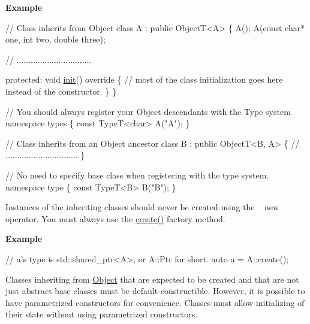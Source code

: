 {\bfseries Example} 
\begin{DoxyCode}
\textcolor{comment}{// Class inherits from Object}
\textcolor{keyword}{class }A : \textcolor{keyword}{public} ObjectT<A>
\{
    A();
    A(\textcolor{keyword}{const} \textcolor{keywordtype}{char}* one, \textcolor{keywordtype}{int} two, \textcolor{keywordtype}{double} three);

    \textcolor{comment}{// ................................}

\textcolor{keyword}{protected}:
    \textcolor{keywordtype}{void} \hyperlink{group___utility_module_gaedfd950d41ec88d7eff2a7a9929e45e8}{init}()\textcolor{keyword}{ override}
\textcolor{keyword}{    }\{
        \textcolor{comment}{// most of the class initialization goes here instead of the constructor.}
    \}
\}

\textcolor{comment}{// You should always register your Object descendants with the Type system}
\textcolor{keyword}{namespace }types \{ \textcolor{keyword}{const} TypeT<char> A(\textcolor{stringliteral}{"A"}); \}

\textcolor{comment}{// Class inherits from an Object ancestor}
\textcolor{keyword}{class }B : \textcolor{keyword}{public} ObjectT<B, A>
\{
    \textcolor{comment}{// ...............................}
\}

\textcolor{comment}{// No need to specify base class when registering with the type system.}
\textcolor{keyword}{namespace }type \{ \textcolor{keyword}{const} TypeT<B> B(\textcolor{stringliteral}{"B"}); \}
\end{DoxyCode}


Instances of the inheriting classes should never be created using the ~\newline
 new operator. You must always use the \hyperlink{classdg_1_1deepcore_1_1_object_t_af1c55ff313922010d054060c22adbf91}{create()} factory method.

{\bfseries Example} 
\begin{DoxyCode}
\textcolor{comment}{// a's type is std::shared\_ptr<A>, or A::Ptr for short.}
\textcolor{keyword}{auto} a = A::create();
\end{DoxyCode}


Classes inheriting from \hyperlink{classdg_1_1deepcore_1_1_object}{Object} that are expected to be created and that are not just abstract base classes must be default-\/constructible. However, it is possible to have parametrized constructors for convenience. Classes must allow initializing of their state without using parametrized constructors.

